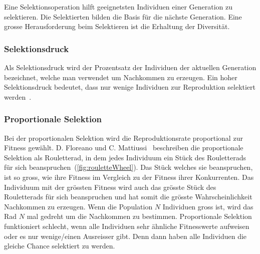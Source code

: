       Eine Selektionsoperation hilft geeignetsten Individuen einer Generation zu selektieren.
      Die Selektierten bilden die Basis für die nächste Generation.
      Eine grosse Herausforderung beim Selektieren ist die Erhaltung der Diversität.

      \subsubsection{Selektionsdruck\label{subsub:SelectionPressure}}

        Als Selektionsdruck wird der Prozentsatz der Individuen der aktuellen Generation bezeichnet,
        welche man verwendet um Nachkommen zu erzeugen.
        Ein hoher Selektionsdruck bedeutet,
        dass nur wenige Individuen zur Reproduktion selektiert werden~\cite[S.23]{book:bioInspired}.

      \subsubsection{Proportionale Selektion}

        Bei der proportionalen Selektion wird die Reproduktionsrate proportional zur Fitness gewählt.
        D. Floreano und C. Mattiussi~\cite[S.23]{book:bioInspired} beschreiben die proportionale Selektion als Rouletterad,
        in dem jedes Individuum ein Stück des Rouletterads für sich beanspruchen~(\vref{fig:rouletteWheel}).
        Das Stück welches sie beanspruchen, ist so gross,
        wie ihre Fitness im Vergleich zu der Fitness ihrer Konkurrenten.
        Das Individuum mit der grössten Fitness wird auch das grösste Stück des Rouletterads für sich beanspruchen und hat somit die grösste Wahrscheinlichkeit Nachkommen zu erzeugen.
        Wenn die Population \(N\) Individuen gross ist, wird das Rad \(N\) mal gedreht um die Nachkommen zu bestimmen.
        Proportionale Selektion funktioniert schlecht,
        wenn alle Individuen sehr ähnliche Fitnesswerte aufweisen oder es nur wenige/einen Ausreisser gibt.
        Denn dann haben alle Individuen die gleiche Chance selektiert zu werden.


